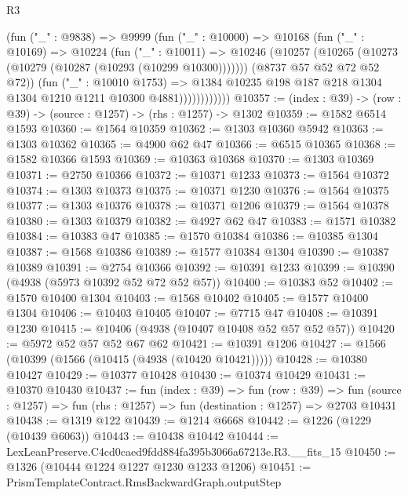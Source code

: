 \begin{lexlean}{R3}
\begin{coremodule}
                    (fun ("_" : @9838) =>
                    @9999
                      (fun ("_" : @10000) =>
                      @10168
                        (fun ("_" : @10169) =>
                        @10224
                          (fun ("_" : @10011) =>
                          @10246
                            (@10257 (@10265 (@10273 (@10279 (@10287 (@10293 (@10299 @10300)))))))
                            (@8737 @57 @52 @72 @52 @72))
                          (fun ("_" : @10010 @1753) =>
                          @1384
                            @10235
                            @198
                            @187
                            @218
                            @1304
                            @1304
                            @1210
                            @1211
                            @10300
                            @4881))))))))))))
@10357 := (index : @39) -> (row : @39) -> (source : @1257) -> (rhs : @1257) -> @1302
@10359 := @1582 @6514 @1593
@10360 := @1564 @10359
@10362 := @1303 @10360 @5942
@10363 := @1303 @10362
@10365 := @4900 @62 @47
@10366 := @6515 @10365
@10368 := @1582 @10366 @1593
@10369 := @10363 @10368
@10370 := @1303 @10369
@10371 := @2750 @10366
@10372 := @10371 @1233
@10373 := @1564 @10372
@10374 := @1303 @10373
@10375 := @10371 @1230
@10376 := @1564 @10375
@10377 := @1303 @10376
@10378 := @10371 @1206
@10379 := @1564 @10378
@10380 := @1303 @10379
@10382 := @4927 @62 @47
@10383 := @1571 @10382
@10384 := @10383 @47
@10385 := @1570 @10384
@10386 := @10385 @1304
@10387 := @1568 @10386
@10389 := @1577 @10384 @1304
@10390 := @10387 @10389
@10391 := @2754 @10366
@10392 := @10391 @1233
@10399 := @10390 (@4938 (@5973 @10392 @52 @72 @52 @57))
@10400 := @10383 @52
@10402 := @1570 @10400 @1304
@10403 := @1568 @10402
@10405 := @1577 @10400 @1304
@10406 := @10403 @10405
@10407 := @7715 @47
@10408 := @10391 @1230
@10415 := @10406 (@4938 (@10407 @10408 @52 @57 @52 @57))
@10420 := @5972 @52 @57 @52 @67 @62
@10421 := @10391 @1206
@10427 := @1566 (@10399 (@1566 (@10415 (@4938 (@10420 @10421)))))
@10428 := @10380 @10427
@10429 := @10377 @10428
@10430 := @10374 @10429
@10431 := @10370 @10430
@10437 := fun (index : @39) =>
  fun (row : @39) =>
  fun (source : @1257) => fun (rhs : @1257) => fun (destination : @1257) => @2703 @10431
@10438 := @1319 @122
@10439 := @1214 @6668
@10442 := @1226 (@1229 (@10439 @6063))
@10443 := @10438 @10442
@10444 := LexLeanPreserve.C4cd0caed9fdd884fa395b3066a67213e.R3.__fits_15
@10450 := @1326 (@10444 @1224 @1227 @1230 @1233 @1206)
@10451 := PrismTemplateContract.RmsBackwardGraph.outputStep

\end{coremodule}
\end{lexlean}

